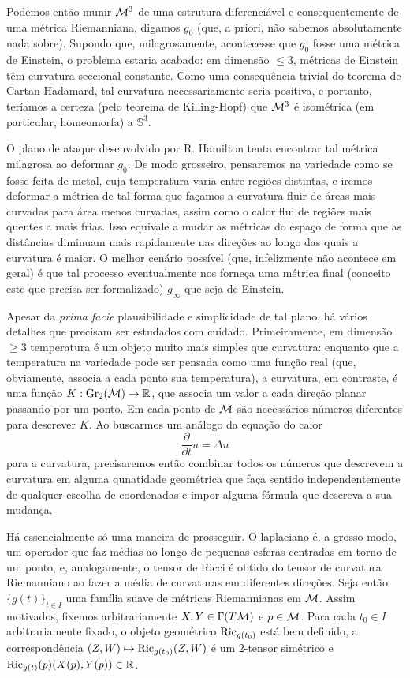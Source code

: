 Podemos então munir $\mathcal{M}^3$ de uma estrutura diferenciável e consequentemente de uma métrica Riemanniana, digamos $g_0$ (que, a priori, não sabemos absolutamente nada sobre). Supondo que, milagrosamente, acontecesse que $g_0$ fosse uma métrica de Einstein, o problema estaria acabado: em dimensão $\leq 3$, métricas de Einstein têm curvatura seccional constante. Como uma consequência trivial do teorema de Cartan-Hadamard, tal curvatura necessariamente seria positiva, e portanto, teríamos a certeza (pelo teorema de Killing-Hopf) que $\mathcal{M}^3$ é isométrica (em particular, homeomorfa) a $\mathbb{S}^3$.\par 
O plano de ataque desenvolvido por R. Hamilton tenta encontrar tal métrica milagrosa ao deformar $g_0$. De modo grosseiro, pensaremos na variedade como se fosse feita de metal, cuja temperatura varia entre regiões distintas, e iremos deformar a métrica de tal forma que façamos a curvatura fluir de áreas mais curvadas para área menos curvadas, assim como o calor flui de regiões mais quentes a mais frias.
Isso equivale a mudar as métricas do espaço de forma que as distâncias diminuam mais rapidamente nas direções ao longo das quais a curvatura é maior. O melhor cenário possível (que, infelizmente não acontece em geral) é que tal processo eventualmente nos forneça uma métrica final (conceito este que precisa ser formalizado) $g_{\infty}$ que seja de Einstein.\par 
Apesar da \emph{prima facie} plausibilidade e simplicidade de tal plano, há vários detalhes que precisam ser estudados com cuidado. Primeiramente, em dimensão $\geq 3$ temperatura é um objeto muito mais simples que curvatura: enquanto que a temperatura na variedade pode ser pensada como uma função real (que, obviamente, associa a cada ponto sua temperatura), a curvatura, em contraste, é uma função $K : \mathrm{Gr}_2(\mathcal{M}) \to \mathbb{R}$, que associa um valor a cada direção planar passando por um ponto. Em cada ponto de $\mathcal{M}$ são necessários  números diferentes para descrever $K$. Ao buscarmos um análogo da equação do calor
\[
\frac{\partial}{\partial t} u = \Delta u
\] para a curvatura, precisaremos então combinar todos os números que descrevem a curvatura em alguma qunatidade geométrica que faça sentido independentemente de qualquer escolha de coordenadas e impor alguma fórmula que descreva a sua mudança. \par 
Há essencialmente só uma maneira de prosseguir. O laplaciano é, a grosso modo, um operador que faz médias ao longo de pequenas esferas centradas em torno de um ponto, e, analogamente, o tensor de Ricci é obtido do tensor de curvatura Riemanniano ao fazer a média de curvaturas em diferentes direções. Seja então $\{g(t) \}_{t \in I}$ uma família suave de métricas Riemannianas em $\mathcal{M}$. Assim motivados, fixemos arbitrariamente $X, Y \in \Gamma(T \mathcal{M})$ e $p \in \mathcal{M}$. Para cada $t_0 \in I$ arbitrariamente fixado, o objeto geométrico $\mathrm{Ric}_{g(t_0)}$ está bem definido, a correspondência $(Z, W) \mapsto \mathrm{Ric}_{g(t_0)}(Z, W)$ é um $2$-tensor simétrico e $\mathrm{Ric}_{g(t)}(p)(X(p), Y(p))\in \mathbb{R}$. 
